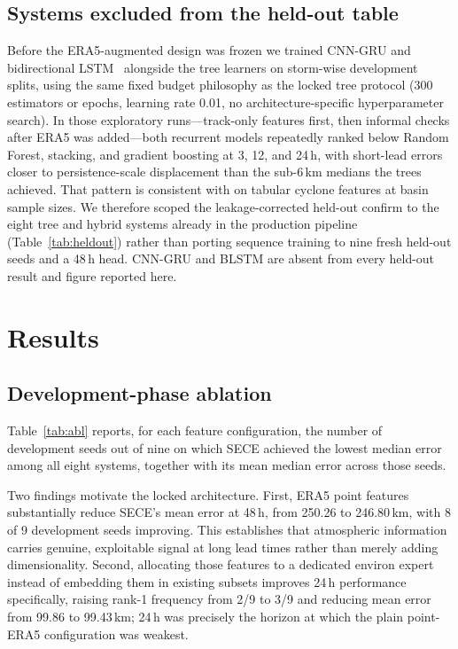 \documentclass{ametsocv6.1}
\newcommand{\sece}{SECE}
\newcommand{\era}{ERA5}
\begin{document}
\subsection{Systems excluded from the held-out table}
\label{sec:dlscope}
Before the \era{}-augmented design was frozen we trained CNN-GRU and
bidirectional LSTM~\citep{lian2020novel,graves2005blstm} alongside the tree
learners on storm-wise development splits, using the same fixed budget philosophy
as the locked tree protocol (300 estimators or epochs, learning rate 0.01, no
architecture-specific hyperparameter search). In those exploratory runs---track-only
features first, then informal checks after \era{} was added---both recurrent
models repeatedly ranked below Random Forest, stacking, and gradient boosting at
3, 12, and 24\,h, with short-lead errors closer to persistence-scale displacement
than the sub-6\,km medians the trees achieved. That pattern is consistent with
\citet{grinsztajn2022tree} on tabular cyclone features at basin sample sizes. We
therefore scoped the leakage-corrected held-out confirm to the eight tree and
hybrid systems already in the production pipeline (Table~\ref{tab:heldout}) rather
than porting sequence training to nine fresh held-out seeds and a 48\,h head.
CNN-GRU and BLSTM are absent from every held-out result and figure reported here.
\section{Results}
\label{sec:results}


\subsection{Development-phase ablation}
\label{sec:ablation}
Table~\ref{tab:abl} reports, for each feature configuration, the number of
development seeds out of nine on which \sece{} achieved the lowest median error
among all eight systems, together with its mean median error across those seeds.

Two findings motivate the locked architecture. First, \era{} point features
substantially reduce \sece{}'s mean error at 48\,h, from 250.26 to 246.80\,km,
with 8 of 9 development seeds improving. This establishes that atmospheric
information carries genuine, exploitable signal at long lead times rather than
merely adding dimensionality. Second, allocating those features to a dedicated
environ expert instead of embedding them in existing subsets improves 24\,h
performance specifically, raising rank-1 frequency from 2/9 to 3/9 and reducing
mean error from 99.86 to 99.43\,km; 24\,h was precisely the horizon at which the
plain point-\era{} configuration was weakest.
\end{document}
